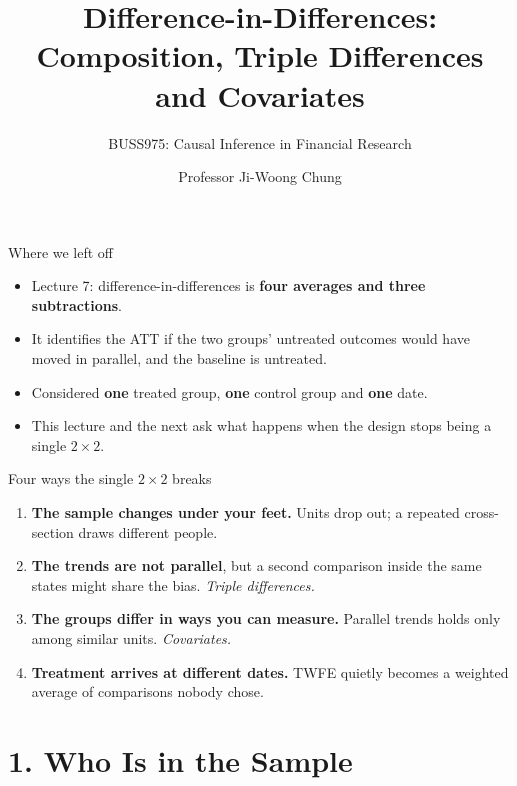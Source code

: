 \documentclass[
  11pt,
  ignorenonframetext,
  aspectratio=169,
]{beamer}
\title{\texorpdfstring{Difference-in-Differences: Composition, Triple
Differences and
Covariates}{Difference-in-Differences: Composition{,} Triple Differences and Covariates}}
\subtitle{\texorpdfstring{BUSS975: Causal Inference in Financial
Research}{BUSS975: Causal Inference in Financial Research}}
\author{Professor Ji-Woong Chung}
\date{}
\institute{Korea University}
\providecommand{\tightlist}{%
  \setlength{\itemsep}{0pt}\setlength{\parskip}{0pt}}
\begin{document}
\frame{\titlepage}


\begin{frame}{Where we left off}
\protect{}\label{where-we-left-off}
\begin{itemize}
\tightlist
\item
  Lecture 7: difference-in-differences is \textbf{four averages and
  three subtractions}.
\item
  It identifies the ATT if the two groups' untreated outcomes would have
  moved in parallel, and the baseline is untreated.
\end{itemize}

\vspace{0.5em}

\begin{itemize}
\tightlist
\item
  Considered \textbf{one} treated group, \textbf{one} control group and
  \textbf{one} date.
\item
  This lecture and the next ask what happens when the design stops being
  a single \(2 \times 2\).
\end{itemize}
\end{frame}

\begin{frame}{Four ways the single \(2 \times 2\) breaks}
\protect{}\label{four-ways-the-single-2-times-2-breaks}
\begin{enumerate}
\tightlist
\item
  \textbf{The sample changes under your feet.} Units drop out; a
  repeated cross-section draws different people.
\item
  \textbf{The trends are not parallel}, but a second comparison inside
  the same states might share the bias. \emph{Triple differences.}
\item
  \textbf{The groups differ in ways you can measure.} Parallel trends
  holds only among similar units. \emph{Covariates.}
\item
  \textbf{Treatment arrives at different dates.} TWFE quietly becomes a
  weighted average of comparisons nobody chose.
\end{enumerate}
\end{frame}

\section{1. Who Is in the Sample}\label{who-is-in-the-sample}
\end{document}
